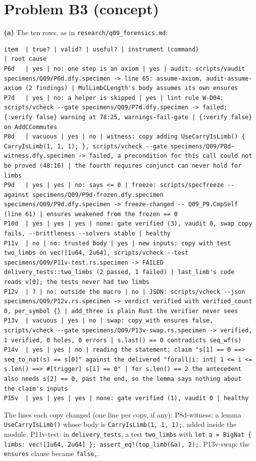 \documentclass[11pt]{article}
\begin{document}
\section*{Problem B3 (concept)}\label{ans:B3}
\begin{answer}
\textbf{(a)} The ten rows, as in \texttt{research/q09\_forensics.md}:
\begin{lstlisting}[basicstyle=\ttfamily\scriptsize,breaklines=true,columns=fullflexible]
item  | true? | valid? | useful? | instrument (command)                    | root cause
P6d   | yes | no: one step is an axiom | yes | audit: scripts/vaudit specimens/Q09/P6d.dfy.specimen -> line 65: assume-axiom, audit-assume-axiom (2 findings) | MulLimbCLength's body assumes its own ensures
P7d   | yes | no: a helper is skipped | yes | lint rule W-D04: scripts/vcheck --gate specimens/Q09/P7d.dfy.specimen -> failed; {:verify false} warning at 78:25, warnings-fail-gate | {:verify false} on AddCCommutes
P8d   | vacuous | yes | no | witness: copy adding UseCarryIsLimb() { CarryIsLimb(1, 1, 1); }, scripts/vcheck --gate specimens/Q09/P8d-witness.dfy.specimen -> failed, a precondition for this call could not be proved (48:16) | the fourth requires conjunct can never hold for limbs
P9d   | yes | yes | no: says <= 0 | freeze: scripts/specfreeze --against specimens/Q09/P9d-frozen.dfy.specimen specimens/Q09/P9d.dfy.specimen -> freeze-changed -- Q09_P9.CmpSelf (line 61) | ensures weakened from the frozen == 0
P10d  | yes | yes | yes | none: gate verified (3), vaudit 0, swap copy fails, --brittleness --solvers stable | healthy
P11v  | no | no: trusted body | yes | new inputs: copy with test two_limbs on vec![1u64, 2u64], scripts/vcheck --test specimens/Q09/P11v-test.rs.specimen -> FAILED delivery_tests::two_limbs (2 passed, 1 failed) | last_limb's code reads v[0]; the tests never had two limbs
P12v  | ? | no: outside the macro | no | JSON: scripts/vcheck --json specimens/Q09/P12v.rs.specimen -> verdict verified with verified_count 0, per_symbol {} | add_three is plain Rust the verifier never sees
P13v  | vacuous | yes | no | swap: copy with ensures false, scripts/vcheck --gate specimens/Q09/P13v-swap.rs.specimen -> verified, 1 verified, 0 holes, 0 errors | s.last() == 0 contradicts seq_wf(s)
P14v  | yes | yes | no | reading the statement: claim "s[1] == 0 ==> seq_to_nat(s) == s[0]" against the delivered "forall|i: int| 1 <= i <= s.len() ==> #[trigger] s[i] == 0" | for s.len() == 2 the antecedent also needs s[2] == 0, past the end, so the lemma says nothing about the claim's inputs
P15v  | yes | yes | yes | none: gate verified (1), vaudit 0 | healthy
\end{lstlisting}
The lines each copy changed (one line per copy, if any): P8d-witness: a lemma
\texttt{UseCarryIsLimb()} whose body is \texttt{CarryIsLimb(1, 1, 1);}, added
inside the module. P11v-test: in \texttt{delivery\_tests}, a test
\texttt{two\_limbs} with \texttt{let a = BigNat \{ limbs: vec![1u64, 2u64] \};
assert\_eq!(top\_limb(\&a), 2);}. P13v-swap: the \texttt{ensures} clause became
\texttt{false,}.


\end{answer}
\end{document}
